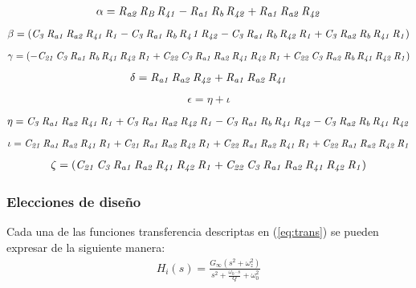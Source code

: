 \begin{align}
\alpha = {\it R_{a2}}\,{\it R_B}\,{\it R_{41}}-{\it R_{a1}}\,{\it R_b}\,{\it R_{42}}+{
\it R_{a1}}\,{\it R_{a2}}\,{\it R_{42}}
\end{align}
\begin{align}
\beta =\left( {\it C_3}\,{\it R_{a1}}\,{\it R_{a2}}\,{
\it R_{41}}\,{\it R_1}-{\it C_3}\,{\it R_{a1}}\,{\it R_b}\,{\it R{_41}}\,{\it R_{42}}-{
\it C_3}\,{\it R_{a1}}\,{\it R_b}\,{\it R_{42}}\,{\it R_1}+{\it C_3}\,{\it R_{a2}}\,{
\it R_b}\,{\it R_{41}}\,{\it R_1} \right)
\end{align}
\begin{align}
\gamma = \left( -{\it C_{21}}\,{\it C_3
}\,{\it R_{a1}}\,{\it R_b}\,{\it R_{41}}\,{\it R_{42}}\,{\it R_1}+{\it C_{22}}\,{\it C_3}
\,{\it R_{a1}}\,{\it R_{a2}}\,{\it R_{41}}\,{\it R_{42}}\,{\it R_1}+{\it C_{22}}\,{\it C_3}
\,{\it R_{a2}}\,{\it R_b}\,{\it R_{41}}\,{\it R_{42}}\,{\it R_1} \right) 
\end{align}
\begin{align}
\delta = {\it R_{a1}}
\,{\it R_{a2}}\,{\it R_{42}}+{\it R_{a1}}\,{\it R_{a2}}\,{\it R_{41}} 
\end{align}
\begin{align}
\epsilon = \eta +  \iota
\end{align}
\begin{align}
\eta ={\it C_3}\,{\it R_{a1}}\,{\it R_{a2}}\,{\it R_{41}}\,{\it R_{1}}+{\it C_3}\,{\it R_{a1}}\,{\it R_{a2}}\,{\it R_{42}}\,{\it R_1}-{\it C_3}\,{\it R_{a1}}\,{\it R_b}\,{\it R_{41}}\,{\it R_{42}}-{
\it C_3}\,{\it R_{a2}}\,{\it R_b}\,{\it R_{41}}\,{\it R_{42}}
\end{align}
\begin{align}
\iota={\it C_{21}}\,{\it R_{a1}}\,{
\it R_{a2}}\,{\it R_{41}}\,{\it R_1}+{\it C_{21}}\,{\it R_{a1}}\,{\it R_{a2}}\,{\it R_{42}}\,{
\it R_1}+{\it C_{22}}\,{\it R_{a1}}\,{\it R_{a2}}\,{\it R_{41}}\,{\it R_1}+{\it C_{22}}\,{
\it R_{a1}}\,{\it R_{a2}}\,{\it R_{42}}\,{\it R_1}
\end{align}
\begin{align}
\zeta = \left( {\it C_{21}}
\,{\it C_3}\,{\it R_{a1}}\,{\it R_{a2}}\,{\it R_{41}}\,{\it R_{42}}\,{\it R_1}+{\it C_{22}}
\,{\it C_3}\,{\it R_{a1}}\,{\it R_{a2}}\,{\it R_{41}}\,{\it R_{42}}\,{\it R_1} \right)
\end{align}
\subsubsection{Elecciones de diseño}
Cada una de las funciones transferencia descriptas en (\ref{eq:trans})
 se pueden expresar de la siguiente manera:
\begin{align}
	H_i(s)=\frac{G_\infty (s^2+\omega_z^2)}{s^2+\frac{\omega_0 \cdot s}{Q}+\omega_0^2}
\end{align} 

